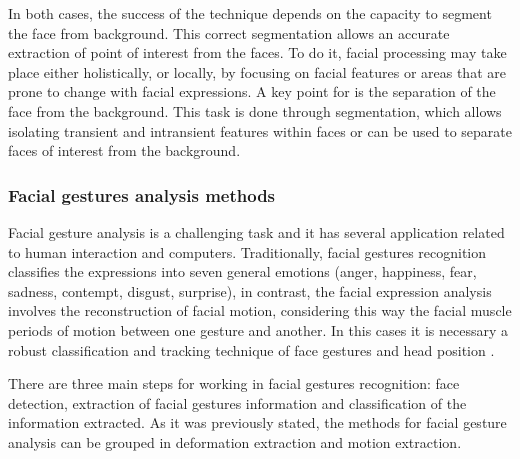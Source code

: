 In both cases, the success of the technique depends on the capacity to segment the face from background. This correct segmentation allows an accurate extraction of point of interest from the faces. To do it, facial processing may take place either holistically, or locally, by focusing on facial features or areas that are prone to change with facial expressions. A key point for is the separation of the face from the background. This task is done through segmentation, which allows isolating transient and intransient features within faces or can be used to separate faces of interest from the background.

\subsubsection{Facial gestures analysis methods}
Facial gesture analysis is a challenging task and it has several application related to human interaction and computers. Traditionally, facial gestures recognition classifies the expressions into seven general emotions (anger, happiness, fear, sadness, contempt, disgust, surprise), in contrast, the facial expression analysis involves the reconstruction of facial motion, considering this way the facial muscle periods of motion between one gesture and another. In this cases it is necessary a robust classification and tracking technique of face gestures and head position \cite{Cinar01}.

There are three main steps for working in facial gestures recognition: face detection, extraction of facial gestures information and classification of the information extracted. As it was previously stated, the methods for facial gesture analysis can be grouped in deformation extraction and motion extraction.%

